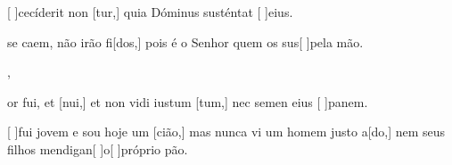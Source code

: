 {  {\item {}[ ]{ce}cíderit non [tur,] quia Dóminus susténtat [ ]{e}ius.~\Antiphona}%
    {\item {} se caem, não irão fi[dos,] pois é o Senhor quem os sus[ ]{pe}la mão.~\Antiphona},
  {\item {}or fui, et [nui,] et non vidi iustum [\-tum,] nec semen eius [ ]{pa}nem.~\Antiphona}%
    {\item {}[ ]{fui} jovem e sou hoje um [cião,] mas nunca vi um homem justo a[\-do,] nem seus filhos mendigan[ ]{o}[ ]{pró}prio pão.~\Antiphona}
}